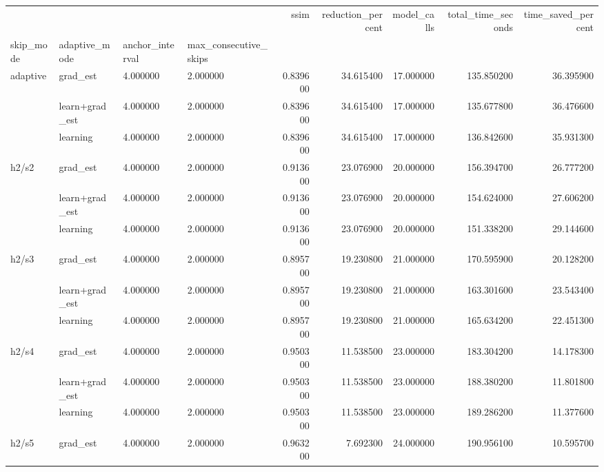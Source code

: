 \begin{tabular}{llllrrrrr}
\toprule
 &  &  &  & ssim & reduction_percent & model_calls & total_time_seconds & time_saved_percent \\
skip_mode & adaptive_mode & anchor_interval & max_consecutive_skips &  &  &  &  &  \\
\midrule
\multirow[t]{3}{*}{adaptive} & grad_est & 4.000000 & 2.000000 & 0.839600 & 34.615400 & 17.000000 & 135.850200 & 36.395900 \\
\cline{2-9} \cline{3-9}
 & learn+grad_est & 4.000000 & 2.000000 & 0.839600 & 34.615400 & 17.000000 & 135.677800 & 36.476600 \\
\cline{2-9} \cline{3-9}
 & learning & 4.000000 & 2.000000 & 0.839600 & 34.615400 & 17.000000 & 136.842600 & 35.931300 \\
\cline{1-9} \cline{2-9} \cline{3-9}
\multirow[t]{3}{*}{h2/s2} & grad_est & 4.000000 & 2.000000 & 0.913600 & 23.076900 & 20.000000 & 156.394700 & 26.777200 \\
\cline{2-9} \cline{3-9}
 & learn+grad_est & 4.000000 & 2.000000 & 0.913600 & 23.076900 & 20.000000 & 154.624000 & 27.606200 \\
\cline{2-9} \cline{3-9}
 & learning & 4.000000 & 2.000000 & 0.913600 & 23.076900 & 20.000000 & 151.338200 & 29.144600 \\
\cline{1-9} \cline{2-9} \cline{3-9}
\multirow[t]{3}{*}{h2/s3} & grad_est & 4.000000 & 2.000000 & 0.895700 & 19.230800 & 21.000000 & 170.595900 & 20.128200 \\
\cline{2-9} \cline{3-9}
 & learn+grad_est & 4.000000 & 2.000000 & 0.895700 & 19.230800 & 21.000000 & 163.301600 & 23.543400 \\
\cline{2-9} \cline{3-9}
 & learning & 4.000000 & 2.000000 & 0.895700 & 19.230800 & 21.000000 & 165.634200 & 22.451300 \\
\cline{1-9} \cline{2-9} \cline{3-9}
\multirow[t]{3}{*}{h2/s4} & grad_est & 4.000000 & 2.000000 & 0.950300 & 11.538500 & 23.000000 & 183.304200 & 14.178300 \\
\cline{2-9} \cline{3-9}
 & learn+grad_est & 4.000000 & 2.000000 & 0.950300 & 11.538500 & 23.000000 & 188.380200 & 11.801800 \\
\cline{2-9} \cline{3-9}
 & learning & 4.000000 & 2.000000 & 0.950300 & 11.538500 & 23.000000 & 189.286200 & 11.377600 \\
\cline{1-9} \cline{2-9} \cline{3-9}
\multirow[t]{3}{*}{h2/s5} & grad_est & 4.000000 & 2.000000 & 0.963200 & 7.692300 & 24.000000 & 190.956100 & 10.595700 \\

\end{tabular}
